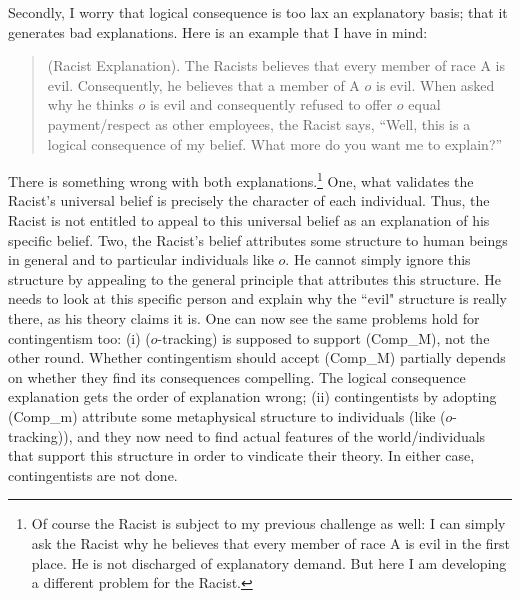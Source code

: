 Secondly, I worry that logical consequence is too lax an explanatory basis; that it generates bad explanations. 
Here is an example that I have in mind:
\begin{quote}
(Racist Explanation). The Racists believes that every member of race A is evil. Consequently, he believes that a member of A $o$ is evil. When asked why he thinks $o$ is evil and consequently refused to offer $o$ equal payment/respect as other employees, the Racist says, ``Well, this is a logical consequence of my belief. What more do you want me to explain?''
\end{quote}
There is something wrong with both explanations.\footnote{Of course the Racist is subject to my previous challenge as well: I can simply ask the Racist why he believes that every member of race A is evil in the first place. He is not discharged of explanatory demand. But here I am developing a different problem for the Racist.} 
One, what validates the Racist's universal belief is precisely the character of each individual. Thus, the Racist is not entitled to appeal to this universal belief as an explanation of his specific belief. Two, the Racist's belief attributes some structure to human beings in general and to particular individuals like $o$. He cannot simply ignore this structure by appealing to the general principle that attributes this structure. He needs to look at this specific person and explain why the ``evil" structure is really there, as his theory claims it is. 
One can now see the same problems hold for contingentism too: (i) ($o$-tracking) is supposed to support (Comp_M), not the other round. Whether contingentism should accept (Comp_M) partially depends on whether they find its consequences compelling. The logical consequence explanation gets the order of explanation wrong; (ii) contingentists by adopting (Comp_m) attribute some metaphysical structure to individuals (like ($o$-tracking)), and they now need to find actual features of the world/individuals that support this structure in order to vindicate their theory. In either case, contingentists are not done.
